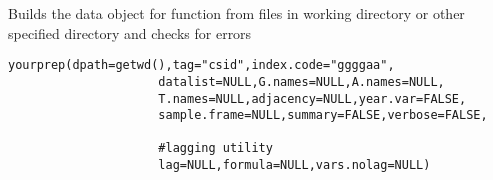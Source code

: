 %
\begin{Description}\relax
Builds the data object for 
function from files in working directory or other specified
directory and checks for errors
\end{Description}
%
\begin{Usage}
\begin{verbatim}
yourprep(dpath=getwd(),tag="csid",index.code="ggggaa",
                     datalist=NULL,G.names=NULL,A.names=NULL,
                     T.names=NULL,adjacency=NULL,year.var=FALSE,
                     sample.frame=NULL,summary=FALSE,verbose=FALSE,

                     #lagging utility
                     lag=NULL,formula=NULL,vars.nolag=NULL)
\end{verbatim}
\end{Usage}
%
